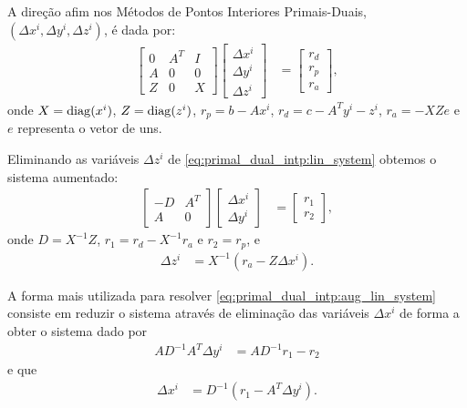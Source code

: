 A direção afim nos Métodos de Pontos Interiores Primais-Duais, $(\Delta x^i,
\Delta y^i, \Delta z^i)$,  é dada por:
\begin{align}
    \begin{bmatrix}
         0 & A^T & I \\
         A & 0 & 0 \\
         Z & 0 & X
     \end{bmatrix} \begin{bmatrix}
         \Delta x^i \\
         \Delta y^i \\
         \Delta z^i
     \end{bmatrix} &= \begin{bmatrix}
         r_d \\
         r_p \\
         r_a
     \end{bmatrix},
     \label{eq:primal_dual_intp:lin_system}
\end{align}
onde $X = \operatorname*{diag}(x^i)$, $Z = \operatorname*{diag}(z^i)$, $r_p = b - A x^i$, $r_d = c - A^T y^i
- z^i$, $r_a = - X Z e$ e $e$ representa o vetor de uns.

Eliminando as variáveis $\Delta z^i$ de \eqref{eq:primal_dual_intp:lin_system}
obtemos o sistema aumentado:
\begin{align}
    \begin{bmatrix}
        -D & A^T \\
        A & 0
    \end{bmatrix} \begin{bmatrix}
        \Delta x^i \\
        \Delta y^i
    \end{bmatrix} &= \begin{bmatrix}
        r_1 \\
        r_2
    \end{bmatrix},
    \label{eq:primal_dual_intp:aug_lin_system}
\end{align}
onde $D = X^{-1} Z$, $r_1 = r_d - X^{-1} r_a$ e $r_2 = r_p$, e
\begin{align*}
    \Delta z^i &= X^{-1} \left( r_a - Z \Delta x^i \right).
\end{align*}

A forma mais utilizada para resolver \eqref{eq:primal_dual_intp:aug_lin_system}
consiste em reduzir o sistema através de eliminação das variáveis $\Delta x^i$ de
forma a obter o sistema dado por
\begin{align}
    A D^{-1} A^T \Delta y^i &= A D^{-1} r_1 - r_2
    \label{eq:primal_dual_intp:lin_norm}
\end{align}
e que
\begin{align*}
    \Delta x^i &= D^{-1} \left( r_1 - A^T \Delta y^i \right).
\end{align*}

